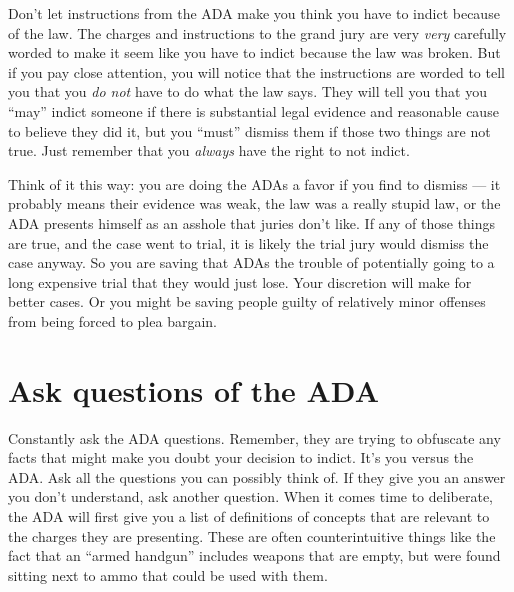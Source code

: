 \documentclass[letterpaper]{article}
\begin{document}
Don't let instructions from the ADA make you think you have to indict because of the law.
The charges and instructions to the grand jury are very \emph{very} carefully worded to make it seem like you have to indict because the law was broken.
But if you pay close attention, you will notice that the instructions are worded to tell you that you \emph{do not} have to do what the law says.
They will tell you that you ``may'' indict someone if there is substantial legal evidence and reasonable cause to believe they did it, but you ``must'' dismiss them if those two things are not true.  
Just remember that you \emph{always} have the right to not indict. 

Think of it this way: you are doing the ADAs a favor if you find to dismiss --- it probably means their evidence was weak, the law was a really stupid law, or the ADA presents himself as an asshole that juries don't like. 
If any of those things are true, and the case went to trial, it is likely the trial jury would dismiss the case anyway. 
So you are saving that ADAs the trouble of potentially going to a long expensive trial that they would just lose. Your discretion will make for better cases.
Or you might be saving people guilty of relatively minor offenses from being forced to plea bargain.


\section*{Ask questions of the ADA}
Constantly ask the ADA questions. 
Remember, they are trying to obfuscate any facts that might make you doubt your decision to indict.  
It's you versus the ADA. 
Ask all the questions you can possibly think of. 
If they give you an answer you don't understand, ask another question. 
When it comes time to deliberate, the ADA will first give you a list of definitions of concepts that are relevant to the charges they are presenting. 
These are often counterintuitive things like the fact that an ``armed handgun'' includes weapons that are empty, but were found sitting next to ammo that could be used with them.
\end{document}
